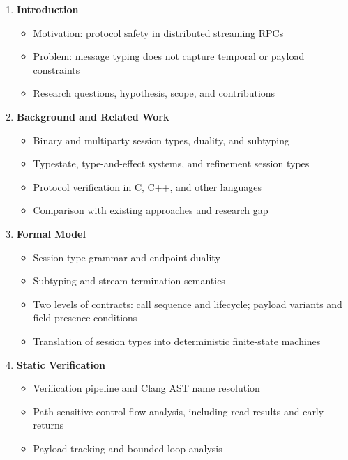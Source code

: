 \documentclass[11pt,a4paper]{article}
\begin{document}
\begin{enumerate}
    \item \textbf{Introduction}
    \begin{itemize}
        \item Motivation: protocol safety in distributed streaming RPCs
        \item Problem: message typing does not capture temporal or payload constraints
        \item Research questions, hypothesis, scope, and contributions
    \end{itemize}

    \item \textbf{Background and Related Work}
    \begin{itemize}
        \item Binary and multiparty session types, duality, and subtyping~\cite{honda-v-k-1998,yoshida-vasconcelos-2007,honda-yoshida-carbone-2008,honda-et-al-2011,gay-hole-2005}
        \item Typestate, type-and-effect systems, and refinement session types~\cite{strom-yemini-1986,nielson-nielson-1999,orchard-yoshida-2016,kouzapas-et-al-2016,pradel-et-al-2012,ueno-das-2026}
        \item Protocol verification in C, C++, and other languages~\cite{hu-yoshida-2016,ng-et-al-2012,ng-yoshida-honda-2012-cc,marques-et-al-2013,alsubhi-et-al-2025}
        \item Comparison with existing approaches and research gap
    \end{itemize}

    \item \textbf{Formal Model}
    \begin{itemize}
        \item Session-type grammar and endpoint duality
        \item Subtyping and stream termination semantics
        \item Two levels of contracts: call sequence and lifecycle; payload variants and field-presence conditions
        \item Translation of session types into deterministic finite-state machines
    \end{itemize}

    \item \textbf{Static Verification}
    \begin{itemize}
        \item Verification pipeline and Clang AST name resolution
        \item Path-sensitive control-flow analysis, including read results and early returns
        \item Payload tracking and bounded loop analysis
    \end{itemize}


\end{enumerate}
\end{document}
